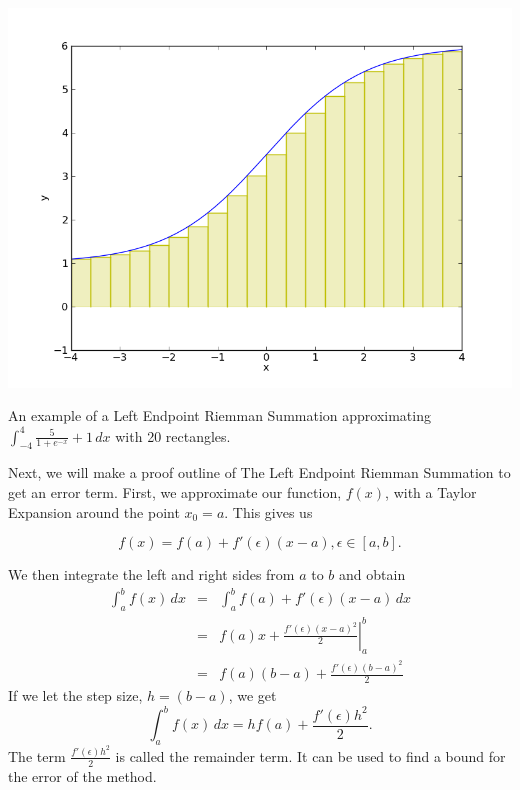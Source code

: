 \documentclass[12pt]{article}
\newcommand{\integral}[3]{\text{$\int^{#2}_{#1} #3\,dx$}}
\begin{document}
\begin{center} \includegraphics[scale = 0.5]{logisticLeftRiemman.png} 

\small An example of a Left Endpoint Riemman Summation approximating $\int^{4}_{-4} \frac{5}{1 +e^{-x}}+1\,dx$ with 20 rectangles.\normalsize
\end{center}

\noindent Next, we will make a proof outline of The Left Endpoint Riemman Summation to get an error term. First, we approximate our function, $f(x)$, with a Taylor Expansion around the point $x_0 = a$. This gives us

\begin{equation*} f(x) = f(a) + f'(\epsilon)(x - a), \epsilon\in[a,b]. \end{equation*}

\noindent We then integrate the left and right sides from $a$ to $b$ and obtain
\begin{eqnarray*}  \integral{a}{b}{f(x)} &=& \integral{a}{b}{f(a) + f'(\epsilon)(x - a)}  \\
&=& \left. f(a)x + \frac{f'(\epsilon)(x - a)^2}{2}\right|_a^b \\
&=& f(a)(b - a) + \frac{f'(\epsilon)(b - a)^2}{2}
\end{eqnarray*}
If we let the step size, $h = (b - a)$, we get 
\begin{equation*} \integral{a}{b}{f(x)} = hf(a) + \frac{f'(\epsilon)h^2}{2}. \end{equation*}
The term $\frac{f'(\epsilon)h^2}{2}$ is called the remainder term. It can be used to find a bound for the error of the method.
\end{document}
